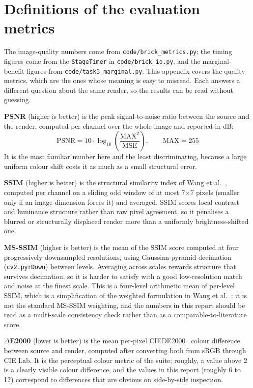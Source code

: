 \documentclass[11pt,a4paper]{article}
\begin{document}
\FloatBarrier
\FloatBarrier
\appendix
\FloatBarrier
\FloatBarrier
\section{Definitions of the evaluation metrics}
\label{app:metrics}

The image-quality numbers come from \texttt{code/brick\_metrics.py}; the timing
figures come from the \texttt{StageTimer} in \texttt{code/brick\_io.py}, and the
marginal-benefit figures from \texttt{code/task3\_marginal.py}. This appendix
covers the quality metrics, which are the ones whose meaning is easy to misread.
Each answers a different question about the same render, so the results can be
read without guessing.

\textbf{PSNR} (higher is better) is the peak signal-to-noise ratio between the
source and the render, computed per channel over the whole image and reported in
dB:
\[
  \mathrm{PSNR} = 10 \cdot \log_{10}\!\left( \frac{\mathrm{MAX}^{2}}{\mathrm{MSE}} \right),
  \qquad \mathrm{MAX} = 255
\]
It is the most familiar number here and the least discriminating, because a large
uniform colour shift costs it as much as a small structural error.

\textbf{SSIM} (higher is better) is the structural similarity index of Wang et
al.~\cite{wang2004ssim}, computed per channel on a sliding odd window of at most
7$\times$7 pixels (smaller only if an image dimension forces it) and averaged.
SSIM scores local contrast and luminance structure rather than raw pixel
agreement, so it penalises a blurred or structurally displaced render more than
a uniformly brightness-shifted one.

\textbf{MS-SSIM} (higher is better) is the mean of the SSIM score computed at
four progressively downsampled resolutions, using Gaussian-pyramid decimation
(\texttt{cv2.pyrDown}) between levels. Averaging across scales rewards structure
that survives decimation, so it is harder to satisfy with a good low-resolution
match and noise at the finest scale. This is a four-level arithmetic mean of
per-level SSIM, which is a simplification of the weighted formulation in Wang et
al.~\cite{wang2003msssim}; it is not the standard MS-SSIM weighting, and the numbers in this
report should be read as a multi-scale consistency check rather than as a
comparable-to-literature score.

\textbf{$\Delta$E2000} (lower is better) is the mean per-pixel CIEDE2000~\cite{sharma2005ciede2000} colour
difference between source and render, computed after converting both from sRGB
through CIE Lab. It is the perceptual colour metric of the suite; roughly, a
value above 2 is a clearly visible colour difference, and the values in this
report (roughly 6 to 12) correspond to differences that are obvious on
side-by-side inspection.
\end{document}
